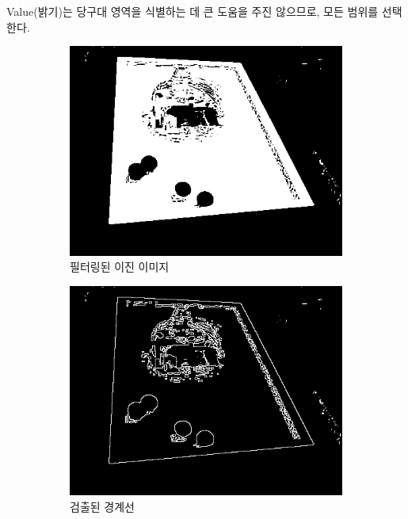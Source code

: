 \documentclass[11pt]{oblivoir}
\begin{document}
    Value(밝기)는 당구대 영역을 식별하는 데 큰 도움을 주진 않으므로, 모든 범위를 선택한다.

    \begin{figure}[ht]
        \centering
        \begin{subfigure}{0.4\textwidth}
            \includegraphics[width=\textwidth]{img/billiards-table-filter.png}
            \caption{필터링된 이진 이미지}
            \label{fig;pool-table-edge-a}
        \end{subfigure}
        \begin{subfigure}{0.4\textwidth}
            \includegraphics[width=\textwidth]{img/billiards-table-edge.png}
            \caption{검출된 경계선}
            \label{fig;pool-table-edge-b}
        \end{subfigure}
        \caption{}
        \label{fig;pool-table-edge}
    \end{figure}
\end{document}
